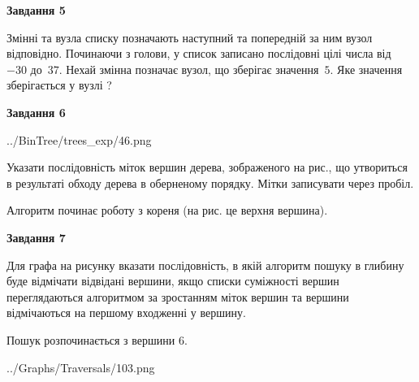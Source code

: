 \documentclass[12pt, ukrainian]{article}
\begin{document}
{\begin {large}
{\begin {center}\textbf{Завдання 5}\end {center}}\par
Змінні  та  вузла списку позначають наступний та попередній за ним вузол відповідно. Починаючи з голови, у список записано послідовні цілі числа від~$-30$ до~$37$. Нехай змінна  позначає вузол, що зберігає значення~$5$.
Яке значення зберігається у вузлі  ?\par
\newpage

{\begin {center}\textbf{Завдання 6}\end {center}}\par

\begin{center}
	{../BinTree/trees_exp/46.png}
\end{center}
Указати послідовність міток вершин дерева, зображеного на рис., що утвориться в результаті обходу дерева в оберненому порядку. Мітки записувати через пробіл.\par Алгоритм починає роботу з кореня (на рис. це верхня вершина).\par
\newpage

{\begin {center}\textbf{Завдання 7}\end {center}}\par
Для графа на рисунку вказати послідовність, в якій алгоритм пошуку в глибину буде відмічати відвідані вершини, якщо списки суміжності вершин переглядаються алгоритмом за зростанням міток вершин та вершини відмічаються на першому вход\-женні у вершину.\par
Пошук розпочинається з вершини 6.\par

\begin{center}
	{../Graphs/Traversals/103.png}
\end{center}\par
\newpage


\end{large}}
\end{document}
